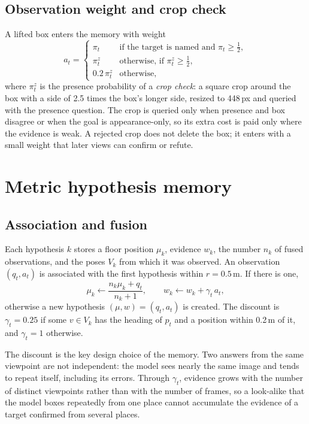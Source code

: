 \subsection{Observation weight and crop check}
A lifted box enters the memory with weight
\begin{equation}
a_t=\begin{cases}\pi_t & \text{if the target is named and } \pi_t\ge\tfrac12,\\
\pi^z_t & \text{otherwise, if } \pi^z_t\ge\tfrac12,\\
0.2\,\pi^z_t & \text{otherwise,}\end{cases}
\label{eq:weight}
\end{equation}
where $\pi^z_t$ is the presence probability of a \emph{crop check}: a square crop around the box with a side of 2.5
times the box's longer side, resized to 448\,px and queried with the presence question. The crop is queried only when
presence and box disagree or when the goal is appearance-only, so its extra cost is paid only where the evidence is
weak. A rejected crop does not delete the box; it enters with a small weight that later views can confirm or refute.

\section{Metric hypothesis memory}
\label{sec:method-memory}
\subsection{Association and fusion}
Each hypothesis $k$ stores a floor position $\mu_k$, evidence $w_k$, the number $n_k$ of fused observations, and the
poses $V_k$ from which it was observed.
An observation $(q_t,a_t)$ is associated with the first hypothesis within $r=0.5$\,m. If there is one,
\begin{equation}
\mu_k\leftarrow\frac{n_k\mu_k+q_t}{n_k+1},\qquad w_k\leftarrow w_k+\gamma_t\,a_t ,
\label{eq:fuse}
\end{equation}
otherwise a new hypothesis $(\mu,w)=(q_t,a_t)$ is created. The
discount is $\gamma_t=0.25$ if some $v\in V_k$ has the heading of $p_t$ and a position within 0.2\,m of it, and
$\gamma_t=1$ otherwise.

The discount is the key design choice of the memory. Two answers from the same viewpoint are not independent: the
model sees nearly the same image and tends to repeat itself, including its errors. Through $\gamma_t$, evidence grows
with the number of distinct viewpoints rather than with the number of frames, so a look-alike that the model boxes
repeatedly from one place cannot accumulate the evidence of a target confirmed from several places.

